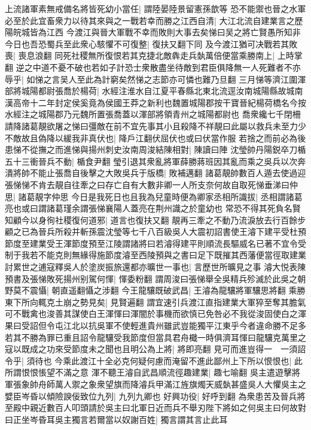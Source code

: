 上流諸軍素無戒備名將皆死幼小當任|{
	謂陸晏陸景留憲孫歆等}
恐不能禦也晉之水軍必至於此宜畜衆力以待其來與之一戰若幸而勝之江西自清|{
	大江北流自建業言之歷陽皖城皆為江西}
今渡江與晉大軍戰不幸而敗則大事去矣悌曰吴之將亡賢愚所知非今日也吾恐蜀兵至此衆心駭懼不可復整|{
	復扶又翻下同}
及今渡江猶可决戰若其敗喪|{
	喪息浪翻}
同死社稷無所復恨若其克捷北敵犇走兵埶萬倍便當乘勝南上|{
	上時掌翻}
逆之中道不憂不破也若如子計恐士衆散盡坐待敵到君臣俱降無一人死難者不亦辱乎|{
	如悌之言吴人至此為計窮矣然悌之志節亦可憐也難乃旦翻}
三月悌等濟江圍渾部將城陽都尉張喬於楊荷|{
	水經注淮水自江夏平春縣北東北流逕汝南城陽縣故城南漢高帝十二年封定侯奚竟為侯國王莽之新利也魏置城陽郡按干寶晉紀楊荷橋名今按水經注之城陽郡乃元魏所置張喬蓋以渾部將領青州之城陽都尉也}
喬衆纔七千閉柵請降諸葛靚欲屠之悌曰彊敵在前不宜先事其小且殺降不祥靚曰此屬以救兵未至力少不敵故且偽降以緩我非真伏也|{
	降戶江翻伏屈伏也或曰伏當作服}
若捨之而前必為後患悌不從撫之而進悌與揚州刺史汝南周浚結陳相對|{
	陳讀曰陣}
沈瑩帥丹陽鋭卒刀楯五十三衝晉兵不動|{
	楯食尹翻}
瑩引退其衆亂將軍薛勝蔣班因其亂而乘之吳兵以次奔潰將帥不能止張喬自後擊之大敗吳兵于版橋|{
	敗補邁翻}
諸葛靚帥數百人遁去使過迎張悌悌不肯去靚自往牽之曰存亡自有大數非卿一人所支奈何故自取死悌垂涕曰仲思|{
	諸葛靚字仲思}
今日是我死日也且我為兒童時便為卿家丞相所識拔|{
	丞相謂諸葛亮也或曰謂諸葛瑾余謂張悌襄陽人蓋亮在荆州識之於童幼也}
常恐不得其死負名賢知顧今以身徇社稷復何道邪|{
	道言也復扶又翻}
靚再三牽之不動乃流淚放去行百餘步顧之已為晉兵所殺并斬孫震沈瑩等七千八百級吳人大震初詔書使王濬下建平受杜預節度至建業受王渾節度預至江陵謂諸將曰若濬得建平則順流長驅威名已著不宜令受制于我若不能克則無緣得施節度濬至西陵預與之書曰足下既摧其西藩便當徑取建業討累世之逋寇釋吳人於塗炭振旅還都亦曠世一事也|{
	言歷世所曠見之事}
濬大悦表陳預書及張悌敗死揚州别駕何惲|{
	惲委粉翻}
謂周浚曰張悌舉全吳精兵殄滅於此吳之朝野莫不震懾|{
	朝直遥翻懾之涉翻}
今王龍驤既破武昌|{
	王濬為龍驤將軍驤思將翻}
乘勝東下所向輒克土崩之勢見矣|{
	見賢遍翻}
謂宜速引兵渡江直指建業大軍猝至奪其膽氣可不戰禽也浚善其謀使白王渾惲曰渾闇於事機而欲慎已免咎必不我從浚固使白之渾果曰受詔但令屯江北以抗吳軍不使輕進貴州雖武豈能獨平江東乎今者違命勝不足多若其不勝為罪已重且詔令龍驤受我節度但當具君舟檝一時俱濟耳惲曰龍驤克萬里之寇以既成之功來受節度未之聞也且明公為上將|{
	將即亮翻}
見可而進豈得一　一須詔令乎|{
	須待也}
今乘此渡江十全必克何疑何慮而淹留不進此鄙州上下所以恨恨也|{
	此所謂恨恨悵望不滿之意}
渾不聽王濬自武昌順流徑趣建業|{
	趣七喻翻}
吳主遣遊擊將軍張象帥舟師萬人禦之象衆望旗而降濬兵甲滿江旌旗燭天威埶甚盛吳人大懼吳主之嬖臣岑昏以傾險諛佞致位九列|{
	九列九卿也}
好興功役|{
	好呼到翻}
為衆患苦及晉兵將至殿中親近數百人叩頭請於吳主曰北軍日近而兵不舉刃陛下將如之何吳主曰何故對曰正坐岑昏耳吳主獨言若爾當以奴謝百姓|{
	獨言謂其言止此耳}
